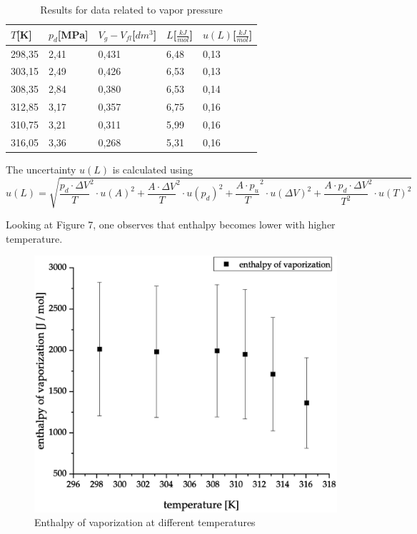 \documentclass[10pt,a4paper]{article}
\begin{document}
\begin{table}[]
\centering
\begin{tabular}{|l|l|l|l|l|}
\hline
$T$[K] & $p_d$[MPa] & $V_g-V_{fl}$[$dm^3$] & $L$[$\frac{kJ}{mol}$] & $u(L)$[$\frac{kJ}{mol}$]  \\ 
\hline 
298,35 & 2,41 & 0,431 & 6,48 & 0,13\\ 
\hline 
303,15 & 2,49 & 0,426 & 6,53 & 0,13\\ 
\hline 
308,35 & 2,84 & 0,380 & 6,53 & 0,14\\ 
\hline 
312,85 & 3,17 & 0,357 & 6,75 & 0,16\\ 
\hline 
310,75 & 3,21 & 0,311 & 5,99 & 0,16\\ 
\hline 
316,05 & 3,36 & 0,268 & 5,31 & 0,16\\ 
\hline 
\end{tabular}
\caption{Results for data related to vapor pressure}
\end{table}
The uncertainty $u(L)$ is calculated using
\begin{equation}
u(L) = \sqrt{\frac{p_d \cdot \Delta V}{T}^2 \cdot u(A)^2 + \frac{A \cdot \Delta V}{T}^2 \cdot u(p_d)^2 + \frac{A \cdot p_u}{T}^2  \cdot  u(\Delta V)^2 + \frac{A \cdot p_d \cdot \Delta V}{T^2}^2  \cdot  u(T)^2}
\end{equation}

Looking at Figure 7, one observes that enthalpy becomes lower with higher temperature.

\begin{figure}[hbt!]
\includegraphics[width=400pt, center]{enthalpy-vs-temperature.eps}
\caption{Enthalpy of vaporization at different temperatures}
\label{fig:length_eight_mouse}
\end{figure}
\end{document}
